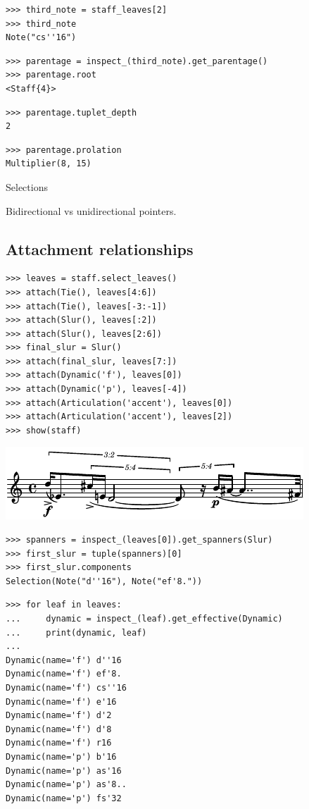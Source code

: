 \begin{lstlisting}
>>> third_note = staff_leaves[2]
>>> third_note
Note("cs''16")
\end{lstlisting}



\begin{lstlisting}
>>> parentage = inspect_(third_note).get_parentage()
>>> parentage.root
<Staff{4}>
\end{lstlisting}


\begin{lstlisting}
>>> parentage.tuplet_depth
2
\end{lstlisting}


\begin{lstlisting}
>>> parentage.prolation
Multiplier(8, 15)
\end{lstlisting}


Selections

Bidirectional vs unidirectional pointers.

\subsection{Attachment relationships}

\begin{lstlisting}
>>> leaves = staff.select_leaves()
>>> attach(Tie(), leaves[4:6])
>>> attach(Tie(), leaves[-3:-1])
>>> attach(Slur(), leaves[:2])
>>> attach(Slur(), leaves[2:6])
>>> final_slur = Slur()
>>> attach(final_slur, leaves[7:])
>>> attach(Dynamic('f'), leaves[0])
>>> attach(Dynamic('p'), leaves[-4])
>>> attach(Articulation('accent'), leaves[0])
>>> attach(Articulation('accent'), leaves[2])
>>> show(staff)
\end{lstlisting}

\includegraphics[scale=1.0]{images/section_4_relationship_modeling-2.pdf}


\begin{lstlisting}
>>> spanners = inspect_(leaves[0]).get_spanners(Slur)
>>> first_slur = tuple(spanners)[0]
>>> first_slur.components
Selection(Note("d''16"), Note("ef'8."))
\end{lstlisting}


\begin{lstlisting}
>>> for leaf in leaves:
...     dynamic = inspect_(leaf).get_effective(Dynamic)
...     print(dynamic, leaf)
... 
Dynamic(name='f') d''16
Dynamic(name='f') ef'8.
Dynamic(name='f') cs''16
Dynamic(name='f') e'16
Dynamic(name='f') d'2
Dynamic(name='f') d'8
Dynamic(name='f') r16
Dynamic(name='p') b'16
Dynamic(name='p') as'16
Dynamic(name='p') as'8..
Dynamic(name='p') fs'32
\end{lstlisting}


